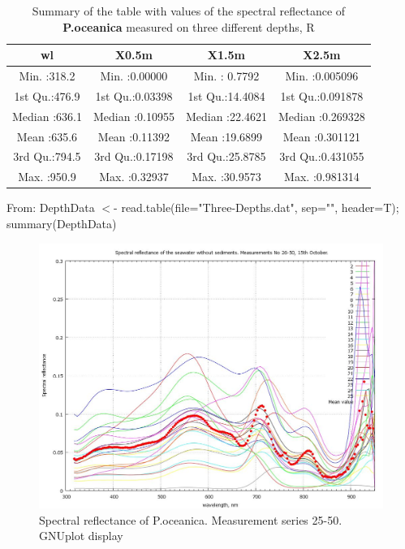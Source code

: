 \documentclass[10pt, a4paper]{article}
\begin{document}
\begin{appendices}
\begin{table}[htbp]
\caption{Summary of the table with values of the spectral reflectance of \textbf{P.oceanica} measured on three different depths, R}
\label{tab:13}
\begin{center}
\begin{tabular}{|c|c|c|c|}
\hline\hline
wl & X0.5m & X1.5m & X2.5m\\ \hline\hline
Min.   :318.2   &  Min.   :0.00000     &   Min.   : 0.7792     &   Min.   :0.005096  \\ \hline
 1st Qu.:476.9   &  1st Qu.:0.03398    &  1st Qu.:14.4084    &  1st Qu.:0.091878  \\ \hline
 Median :636.1   &   Median :0.10955    &  Median :22.4621   &  Median :0.269328 \\ \hline 
 Mean   :635.6   &   Mean   :0.11392   &   Mean   :19.6899   &  Mean   :0.301121  \\ \hline
 3rd Qu.:794.5   &   3rd Qu.:0.17198   &   3rd Qu.:25.8785    &  3rd Qu.:0.431055 \\ \hline  
 Max.   :950.9     &  Max.   :0.32937    &  Max.   :30.9573   &   Max.   :0.981314  \\ \hline
\end{tabular}
\end{center}
From: DepthData $<$- read.table(file="Three-Depths.dat", sep="", header=T); summary(DepthData)
\end{table}

\begin{figure}[H]
\begin{center}
\includegraphics[scale=0.25]{GNU-11.jpg}
\caption{Spectral reflectance of P.oceanica. Measurement series 25-50. GNUplot display­}
\label{fig:54}
\end{center}
\end{figure}
\pagebreak


\end{appendices}
\end{document}
